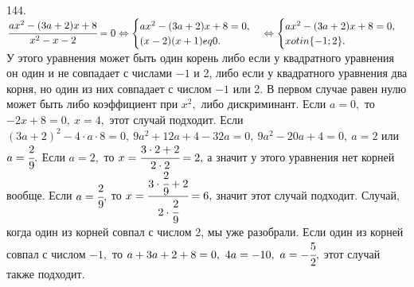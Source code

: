 144. $\cfrac{ax^2-(3a+2)x+8}{x^2-x-2}=0\Leftrightarrow \begin{cases}
ax^2-(3a+2)x+8=0,\\ (x-2)(x+1)
eq0.\end{cases}\Leftrightarrow \begin{cases}
ax^2-(3a+2)x+8=0,\\ x
otin\{-1;2\}.\end{cases}$ У этого уравнения может быть один корень либо если у квадратного уравнения он один и не совпадает с числами $-1$ и 2, либо если у квадратного уравнения два корня, но один из них совпадает с числом $-1$ или 2. В первом случае равен нулю может быть либо коэффициент при $x^2,$ либо дискриминант. Если $a=0,$ то $-2x+8=0,\ x=4,$ этот случай подходит. Если $(3a+2)^2-4\cdot a\cdot8=0,\ 9a^2+12a+4-32a=0,\
9a^2-20a+4=0,\ a=2$ или $a=\cfrac{2}{9}.$ Если $a=2,$ то $x=\cfrac{3\cdot2+2}{2\cdot2}=2,$ а значит у этого уравнения нет корней вообще. Если $a=\cfrac{2}{9},$ то $x=\cfrac{3\cdot\cfrac{2}{9}+2}{2\cdot\cfrac{2}{9}}=6,$ значит этот случай подходит. Случай, когда один из корней совпал с числом 2, мы уже разобрали. Если один из корней совпал с числом $-1,$ то $a+3a+2+8=0,\ 4a=-10,\ a=-\cfrac{5}{2},$ этот случай также подходит.\\
